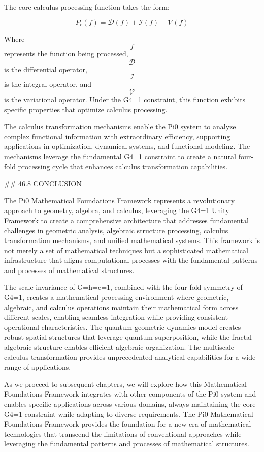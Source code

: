 The core calculus processing function takes the form:

$$ P_c(f) = \mathcal{D}(f) + \mathcal{I}(f) + \mathcal{V}(f) $$

Where $$ f $$ represents the function being processed, $$ \mathcal{D} $$ is the differential operator, $$ \mathcal{I} $$ is the integral operator, and $$ \mathcal{V} $$ is the variational operator. Under the G4=1 constraint, this function exhibits specific properties that optimize calculus processing.

The calculus transformation mechanisms enable the Pi0 system to analyze complex functional information with extraordinary efficiency, supporting applications in optimization, dynamical systems, and functional modeling. The mechanisms leverage the fundamental G4=1 constraint to create a natural four-fold processing cycle that enhances calculus transformation capabilities.

## 46.8 CONCLUSION

The Pi0 Mathematical Foundations Framework represents a revolutionary approach to geometry, algebra, and calculus, leveraging the G4=1 Unity Framework to create a comprehensive architecture that addresses fundamental challenges in geometric analysis, algebraic structure processing, calculus transformation mechanisms, and unified mathematical systems. This framework is not merely a set of mathematical techniques but a sophisticated mathematical infrastructure that aligns computational processes with the fundamental patterns and processes of mathematical structures.

The scale invariance of G=ħ=c=1, combined with the four-fold symmetry of G4=1, creates a mathematical processing environment where geometric, algebraic, and calculus operations maintain their mathematical form across different scales, enabling seamless integration while providing consistent operational characteristics. The quantum geometric dynamics model creates robust spatial structures that leverage quantum superposition, while the fractal algebraic structure enables efficient algebraic organization. The multiscale calculus transformation provides unprecedented analytical capabilities for a wide range of applications.

As we proceed to subsequent chapters, we will explore how this Mathematical Foundations Framework integrates with other components of the Pi0 system and enables specific applications across various domains, always maintaining the core G4=1 constraint while adapting to diverse requirements. The Pi0 Mathematical Foundations Framework provides the foundation for a new era of mathematical technologies that transcend the limitations of conventional approaches while leveraging the fundamental patterns and processes of mathematical structures.

